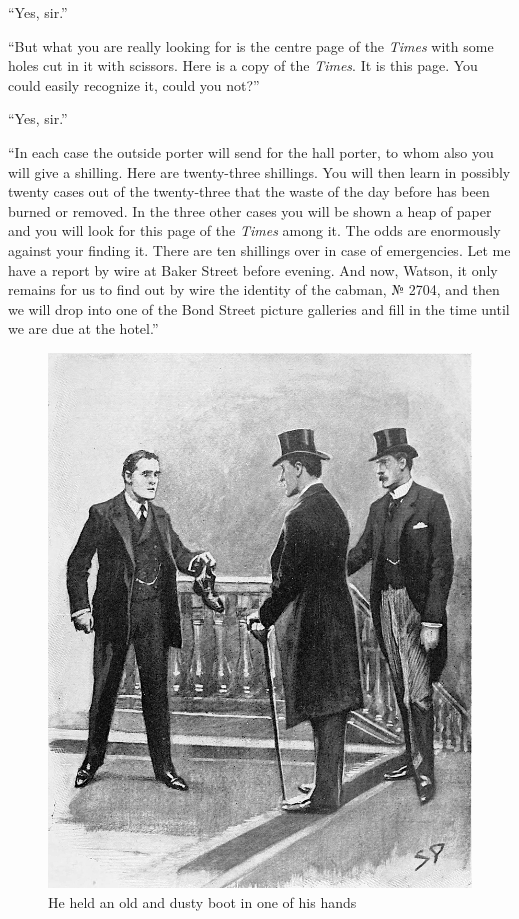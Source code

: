 \documentclass[paper=a5,BCOR=7mm,twoside,DIV=calc,12pt,usegeometry,openany,chapterprefix,endperiod,headings=big]{scrbook} %
\begin{document}
\enquote{Yes, sir.}

\enquote{But what you are really looking for is the centre page of the \textit{Times} with some holes cut in it with scissors. Here is a copy of the \textit{Times}. It is this page. You could easily recognize it, could you not?}

\enquote{Yes, sir.}

\enquote{In each case the outside porter will send for the hall porter, to whom also you will give a shilling. Here are twenty-three shillings. You will then learn in possibly twenty cases out of the twenty-three that the waste of the day before has been burned or removed. In the three other cases you will be shown a heap of paper and you will look for this page of the \textit{Times} among it. The odds are enormously against your finding it. There are ten shillings over in case of emergencies. Let me have a report by wire at Baker Street before evening. And now, Watson, it only remains for us to find out by wire the identity of 
the cabman, № 2704, and then we will drop into one of the Bond Street picture galleries and fill in the time until we are due at the hotel.}

\clearpage
\vfill
\begin{figure}[ph!]
\centering
\includegraphics[width=\linewidth]{05_oldboot}
\caption{He held an old and dusty boot in one of his hands}
\end{figure}
\vfill
\thispagestyle{empty}
\clearpage
\end{document}
